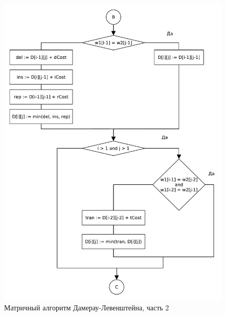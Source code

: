 \begin{figure}[H]
    \centering
    \includegraphics[scale=0.75]{pdf/damerau-levenshteain-part2.pdf}
    \caption{Матричный алгоритм Дамерау-Левенштейна, часть 2}
\end{figure}

